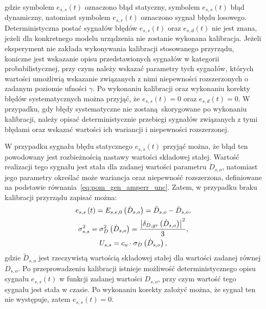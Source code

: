 gdzie symbolem $e_{s,s}(t)$ oznaczono błąd statyczny, symbolem $e_{s,s}(t)$ błąd dynamiczny, natomiast symbolem $e_{s,r}(t)$ oznaczono sygnał błędu losowego. Deterministyczna postać sygnałów błędów $e_{s,s}(t)$ oraz $e_{s,d}(t)$ nie jest znana, jeżeli dla konkretnego modelu urządzenia nie zostanie wykonana kalibracja. Jeżeli eksperyment nie zakłada wykonywania kalibracji stosowanego przyrządu, koniczne jest wskazanie opisu przedstawionych sygnałów w kategorii probabilistycznej, przy czym należy wskazać parametry tych sygnałów, których wartości umożliwią wskazanie związanych z nimi niepewności rozszerzonych o zadanym poziomie ufności $\gamma$. Po wykonaniu kalibracji oraz wykonaniu korekty błędów systematycznych można przyjąć, że $e_{s,s}(t) = 0$ oraz $e_{s,d}(t) = 0$. W przypadku, gdy błędy systematyczne nie zostaną skorygowane po wykonaniu kalibracji, należy opisać deterministycznie przebiegi sygnałów związanych z tymi błędami oraz wskazać wartości ich wariancji i niepewności rozszerzonej.

W przypadku sygnału błędu statycznego $e_{s,s}(t)$ przyjąć można, że błąd ten powodowany jest rozbieżnością nastawy wartości składowej stałej. Wartość realizacji tego sygnału jest stała dla zadanej wartości parametru $\dot{D}_{s,o}$, natomiast jego parametry określać może wariancja oraz niepewność rozszerzona, definiowane na podstawie równania~\eqref{eq:pom_gen_amperr_unc}. Zatem, w przypadku braku kalibracji przyrządu zapisać można:
\begin{gather}
e_{s,s} \left(t\right) = E_{s,e,0} \left(\dot{D}_{s,o}\right) = \tilde{D}_{s,o} - \dot{D}_{s,o} \label{eq:pom_gen_err_stat}, \\
\sigma_{s,s}^{2} = \sigma_{D}^{2} \left(\dot{D}_{s,o}\right) = \frac{\left| \delta_{D,gr} \left(\dot{D}_{s,o}\right) \right|^{2}}{3} \label{eq:pom_gen_var_stat}, \\
U_{s,s} = c_{u} \cdot \sigma_{D} \left(\dot{D}_{s,o}\right) \label{eq:pom_gen_unc_stat},
\end{gather}
gdzie $\tilde{D}_{s,o}$ jest rzeczywistą wartością składowej stałej dla wartości zadanej równej $\dot{D}_{s,o}$. Po przeprowadzeniu kalibracji istnieje możliwość deterministycznego opisu sygnału $e_{s,s}(t)$ w funkcji zadanej wartości $\dot{D}_{s,o}$, przy czym wartość tego sygnału jest stała w czasie. Po wykonaniu korekty założyć można, że sygnał ten nie występuje, zatem $e_{s,s}(t) = 0$.

